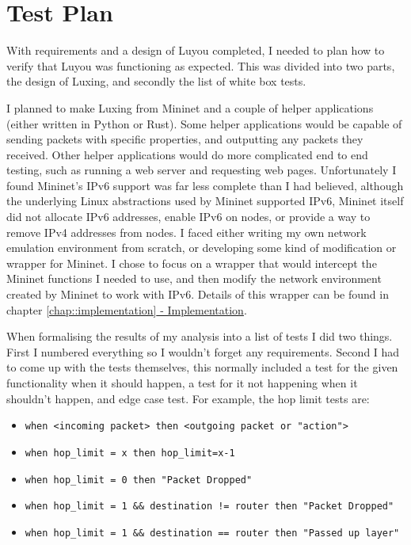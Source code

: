\documentclass[12pt,a4paper,twoside,openany]{report}
\begin{document}
\section{Test Plan}
\label{sec:test_plan}

With requirements and a design of Luyou completed, I needed to plan how to verify that Luyou was functioning as expected.  This was divided into two parts, the design of Luxing, and secondly the list of white box tests.

\bigskip

I planned to make Luxing from Mininet and a couple of helper applications (either written in Python or Rust).  Some helper applications would be capable of sending packets with specific properties, and outputting any packets they received. Other helper applications would do more complicated end to end testing, such as running a web server and requesting web pages.  Unfortunately I found Mininet's IPv6 support was far less complete than I had believed, although the underlying Linux abstractions used by Mininet supported IPv6, Mininet itself did not allocate IPv6 addresses, enable IPv6 on nodes, or provide a way to remove IPv4 addresses from nodes.  I faced either writing my own network emulation environment from scratch, or developing some kind of modification or wrapper for Mininet.  I chose to focus on a wrapper that would intercept the Mininet functions I needed to use, and then modify the network environment created by Mininet to work with IPv6. Details of this wrapper can be found in chapter \ref{chap::implementation}\hyperref[chap::implementation]{ - Implementation}.

\bigskip

When formalising the results of my analysis into a list of tests I did two things. First I  numbered everything so I wouldn't forget any requirements.  Second I had to come up with the tests themselves, this normally included a test for the given functionality when it should happen, a test for it not happening when it shouldn't happen, and edge case test.  For example, the hop limit tests are:
\begin{itemize}
\item \verb!when <incoming packet> then <outgoing packet or "action">!
\item \verb!when hop_limit = x then hop_limit=x-1!
\item \verb!when hop_limit = 0 then "Packet Dropped"!
\item \verb+when hop_limit = 1 && destination != router then "Packet Dropped" +
\item \verb!when hop_limit = 1 && destination == router then "Passed up layer"!
\end{itemize}
\end{document}
